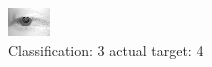 \begin{figure}[h!]
\begin{center}
\includegraphics[width=0.60\columnwidth]{figures/ID2686_class_3_target_4.png}
\end{center}
\caption{ Classification: 3 actual target: 4}
\label{fig:ID2686_class_3_target_4}
\end{figure}
